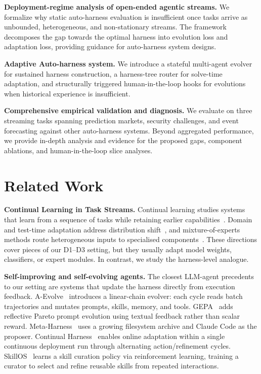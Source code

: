 \documentclass[11pt]{article}
\theoremstyle{plain}
\begin{document}
\begin{compactenum}[(1)]
  \item {\textbf{Deployment-regime analysis of open-ended agentic streams.} We formalize why static auto-harness evaluation is insufficient once tasks arrive as unbounded, heterogeneous, and non-stationary streams. The framework decomposes the gap towards the optimal harness into evolution loss and adaptation loss, providing guidance for auto-harness system designs.}
  \item {\textbf{Adaptive Auto-harness system.} We introduce a stateful multi-agent evolver for sustained harness construction, a harness-tree router for solve-time adaptation, and structurally triggered human-in-the-loop hooks for evolutions when historical experience is insufficient.}
  \item \textbf{Comprehensive empirical validation and diagnosis.} We evaluate on three streaming tasks spanning prediction markets, security challenges, and event forecasting against other auto-harness systems. Beyond aggregated performance, we provide in-depth analysis and evidence for the proposed gaps, component ablations, and human-in-the-loop slice analyses.
\end{compactenum}




\section{Related Work}
\label{sec:related}

\noindent\textbf{Continual Learning in Task Streams.}
Continual learning studies systems that learn from a sequence of tasks while retaining earlier capabilities~\cite{buzzega2020dark,wang2022learning,wang2022dualprompt}. Domain and test-time adaptation address distribution shift~\cite{ben-david2010da,ganin2016dann,wang2021tent,liang2020shot}, and mixture-of-experts methods route heterogeneous inputs to specialised components~\cite{jacobs1991moe,shazeer2017moe}. These directions cover pieces of our D1--D3 setting, but they usually adapt model weights, classifiers, or expert modules. In contrast, we study the harness-level analogue.

\noindent\textbf{Self-improving and self-evolving agents.}
The closest LLM-agent precedents to our setting are systems that update the harness directly from execution feedback. A-Evolve~\cite{lin2026position} introduces a linear-chain evolver: each cycle reads batch trajectories and mutates prompts, skills, memory, and tools. GEPA~\cite{agrawal2025gepa} adds reflective Pareto prompt evolution using textual feedback rather than scalar reward. Meta-Harness~\cite{lee2026meta} uses a growing filesystem archive and Claude Code as the proposer. Continual Harness~\cite{karten2026continual} enables online adaptation within a single continuous deployment run through alternating action/refinement cycles. SkillOS~\cite{ouyang2026skillos} learns a skill curation policy via reinforcement learning, training a curator to select and refine reusable skills from repeated interactions. 
\end{document}
